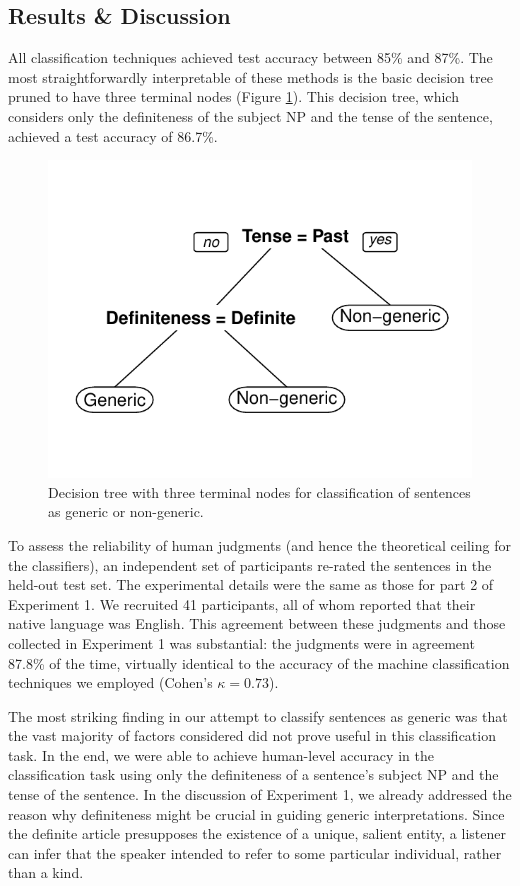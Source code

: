 \documentclass[10pt,letterpaper]{article}
\begin{document}
\subsection{Results \& Discussion}

All classification techniques achieved test accuracy between 85\% and 87\%. The most straightforwardly interpretable of these methods is the basic decision tree pruned to have three terminal nodes (Figure \ref{fig:tree}). This decision tree, which considers only the definiteness of the subject NP and the tense of the sentence, achieved a test accuracy of 86.7\%.

\begin{figure}[t]
\centering
\includegraphics[width=.8\linewidth]{figures/tree.pdf}
\caption{\label{fig:tree} Decision tree with three terminal nodes for classification of sentences as generic or non-generic.}
\end{figure}

To assess the reliability of human judgments (and hence the theoretical ceiling for the classifiers), an independent set of participants re-rated the sentences in the held-out test set. The experimental details were the same as those for part 2 of Experiment 1. We recruited 41 participants, all of whom reported that their native language was English. This agreement between these judgments and those collected in Experiment 1 was substantial: the judgments were in agreement 87.8\% of the time, virtually identical to the accuracy of the machine classification techniques we employed (Cohen's \(\kappa = 0.73\)).

The most striking finding in our attempt to classify sentences as generic was that the vast majority of factors considered did not prove useful in this classification task. In the end, we were able to achieve human-level accuracy in the classification task using only the definiteness of a sentence's subject NP and the tense of the sentence. In the discussion of Experiment 1, we already addressed the reason why definiteness might be crucial in guiding generic interpretations. Since the definite article presupposes the existence of a unique, salient entity, a listener can infer that the speaker intended to refer to some particular individual, rather than a kind.
\end{document}
